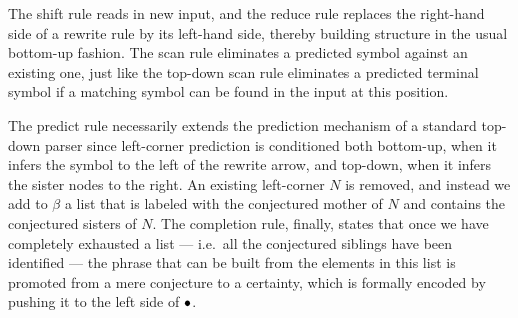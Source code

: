 \begin{prooftree}
\end{prooftree}

\begin{prooftree}
\end{prooftree}

The shift rule reads in new input, and the reduce rule replaces the right-hand side of a rewrite rule by its left-hand side, thereby building structure in the usual bottom-up fashion.
The scan rule eliminates a predicted symbol against an existing one, just like the top-down scan rule eliminates a predicted terminal symbol if a matching symbol can be found in the input at this position.%

The predict rule necessarily extends the prediction mechanism of a standard top-down parser since left-corner prediction is conditioned both bottom-up, when it infers the symbol to the left of the rewrite arrow, and top-down, when it infers the sister nodes to the right.
An existing left-corner $N$ is removed, and instead we add to $\beta$ a list that is labeled with the conjectured mother of $N$ and contains the conjectured sisters of $N$.
The completion rule, finally, states that once we have completely exhausted a list --- i.e.\ all the conjectured siblings have been identified --- the phrase that can be built from the elements in this list is promoted from a mere conjecture to a certainty, which is formally encoded by pushing it to the left side of $\psep$.

